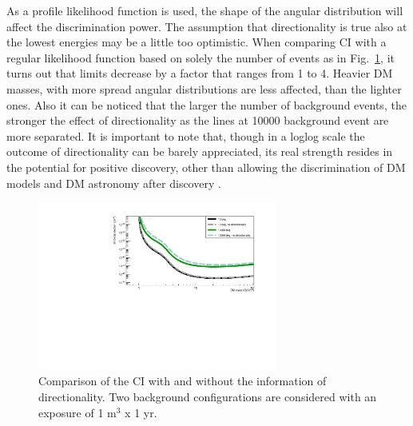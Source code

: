 \documentclass[physics,article,submit,moreauthors,pdftex]{Definitions/mdpi}
\begin{document}
As a profile likelihood function is used, the shape of the angular distribution will affect the discrimination power. The assumption that directionality is true also at the lowest energies may be a little too optimistic. When comparing CI with a regular likelihood function based on solely the number of events as in Fig.~\ref{fig:nodir}, it turns out that limits decrease by a factor that ranges from 1 to 4. Heavier DM masses, with more spread angular distributions are less affected, than the lighter ones. Also it can be noticed that the larger the number of background events, the stronger the effect of directionality as the lines at 10000 background event are more separated. It is important to note that, though in a loglog scale the outcome of directionality can be barely appreciated, its real strength resides in the potential for positive discovery, other than allowing the discrimination of DM models and DM astronomy after discovery \cite{bib:Baracchini_2020}.
\begin{figure}[t]
\centering
 \includegraphics[width=0.7\textwidth]{Compare_directionality.pdf}
 \caption{Comparison of the CI with and without the information of directionality. Two background configurations are considered with an exposure of 1 m$^3$ x 1 yr.}
 \label{fig:nodir}
 \end{figure}
\end{document}
